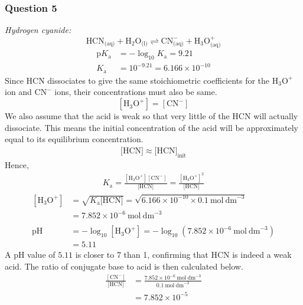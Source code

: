 \documentclass[11pt,a4paper]{article}
\begin{document}
\subsubsection*{Question 5} 
	\emph{Hydrogen cyanide:}
	$$\text{HCN}_{\text{(aq)}} + \text{H}_2 \text{O}_{\text{(l)}} \rightleftharpoons \text{CN}^-_{\text{(aq)}} + \text{H}_3 \text{O}_{\text{(aq)}}^+$$
	\begin{align*}
		\text{p} K_{\text{a}} &= -\log_{10} K_{\text{a}} = 9.21 \\
		K_{\text{a}} &= 10^{-9.21} = 6.166 \times 10^{-10}
	\end{align*}
	Since HCN dissociates to give the same stoichiometric coefficients for the $\text{H}_3 \text{O}^+$ ion and $ \text{CN}^-$ ions, their concentrations must also be same. 
	$$\left[\text{H}_3 \text{O}^+\right] = \left[\text{CN}^- \right]$$
	We also assume that the acid is weak so that very little of the HCN will actually dissociate. This means the initial concentration of the acid will be approximately equal to its equilibrium
	concentration.
	\begin{align*}
		\big[\text{HCN}\big] \approx \big[\text{HCN}\big]_{\text{init}}
	\end{align*}
	Hence,
	\begin{align*}
		K_{\text{a}} = \frac{\left[\text{H}_3 \text{O}^+\right] \left[\text{CN}^- \right]}{\big[\text{HCN}\big]} = \frac{\left[\text{H}_3 \text{O}^+\right]^2}{\big[\text{HCN}\big]} 
	\end{align*}
	\begin{align*}
		\left[\text{H}_3 \text{O}^+\right] &= \sqrt{K_{\text{a}} \big[\text{HCN}\big]} = \sqrt{6.166 \times 10^{-10} \times 0.1 \ \text{mol} \ \text{dm}^{-3}} \\
		&= 7.852 \times 10^{-6} \ \text{mol} \ \text{dm}^{-3} \\
		\\
		\text{pH} &= -\log_{10} \left[\text{H}_3 \text{O}^+\right] = -\log_{10} \left( 7.852 \times 10^{-6} \ \text{mol} \ \text{dm}^{-3}\right) \\
		&= 5.11
	\end{align*}
	A pH value of $5.11$ is closer to 7 than 1, confirming that HCN is indeed a weak acid. The ratio of conjugate base to acid is then calculated below.
	\begin{align*}
		 \frac{\left[\text{CN}^- \right]}{\big[\text{HCN}\big]} &= \frac{7.852 \times 10^{-6} \ \text{mol} \ \text{dm}^{-3}}{ 0.1 \ \text{mol} \ \text{dm}^{-3}} \\
		&= 7.852 \times 10^{-5}
	\end{align*}
\end{document}
